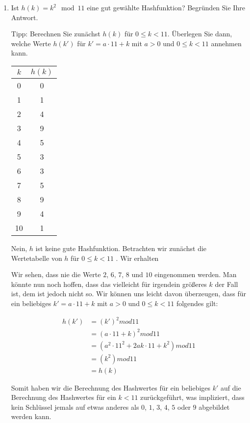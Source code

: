 \documentclass{lehramt-informatik-haupt}
\begin{document}
\begin{enumerate}


\item Ist $h(k) = k^2 \mod 11$ eine gut gewählte Hashfunktion? Begründen
Sie Ihre Antwort.

Tipp: Berechnen Sie zunächst $h(k)$ für $0 \leq k < 11$. Überlegen Sie
dann, welche Werte $h(k')$ für $k' = a \cdot 11 + k$ mit $a > 0$ und $0
\leq k < 11$ annehmen kann.

\begin{antwort}

\begin{center}
\begin{tabular}{|c|c|}
\hline
$k$ & $h(k)$\\\hline\hline
0 & 0\\\hline
1 & 1\\\hline
2 & 4\\\hline
3 & 9\\\hline
4 & 5\\\hline
5 & 3\\\hline
6 & 3\\\hline
7 & 5\\\hline
8 & 9\\\hline
9 & 4\\\hline
10 & 1\\\hline
\end{tabular}
\end{center}

Nein, $h$ ist keine gute Hashfunktion. Betrachten wir zunächst die
Wertetabelle von $h$ für $0 \leq k < 11$ . Wir erhalten

Wir sehen, dass nie die Werte $2$, $6$, $7$, $8$ und $10$ eingenommen
werden. Man könnte nun noch hoffen, dass das vielleicht für irgendein
größeres $k$ der Fall ist, dem ist jedoch nicht so. Wir können uns
leicht davon überzeugen, dass für ein beliebiges $k' = a \cdot 11 + k$
mit $a > 0$ und $0 \leq k < 11$ folgendes gilt:

\begin{align*}
h(k')
  &= (k')^2 mod 11\\
  &= (a \cdot 11 + k)^2 mod 11\\
  &= (a^2 \cdot 11^2 + 2ak \cdot 11 + k^2) mod 11\\
  &= (k^2) mod 11\\
  &= h(k)
\end{align*}

Somit haben wir die Berechnung des Hashwertes für ein beliebiges $k'$
auf die Berechnung des Hashwertes für ein $k < 11$ zurückgeführt, was
impliziert, dass kein Schlüssel jemals auf etwas anderes als $0$, $1$,
$3$, $4$, $5$ oder $9$ abgebildet werden kann.
\end{antwort}


\end{enumerate}
\end{document}
